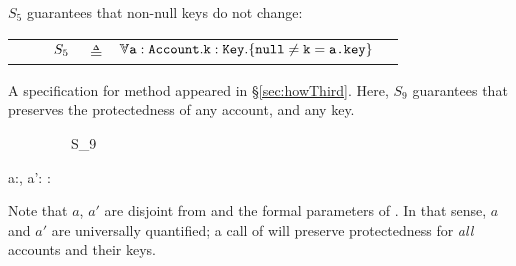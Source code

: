 {
 \begin{example}
 \label{example:twostate}
 $S_5$  guarantees   that   non-null keys do not change:
 \\
 \begin{tabular}{lcll}
$\strut \ \ \ \ \ \ \ \ S_5$ & $\triangleq$   & ${\TwoStatesN {\prg{a}:\prg{Account}.\prg{k}:\prg{Key}}  {\prg{null}\neq \prg{k}=\prg{a.\password}}} $  \end{tabular}
 \end{example} 
 }

 \begin{example}
 \label{example:mprepostl}
 A specification for method  appeared in \S\ref{sec:howThird}. 
Here,  $S_9$    guarantees that  preserves the protectedness of any account, and any key. %

   {\sprepost
		{\strut \ \ \ \ \ \ \ \ \ S_9} 
		{  a:, a':\wedge  {}\wedge  {} }
		{} {} {:}
		{   \wedge  {}  }
		{   \wedge  {} }
}

Note that %
$a$, $a'$ are disjoint from  and the formal parameters of . 
In that sense, $a$ and $a'$ are universally quantified; a call of  will preserve protectedness for \emph{ all} accounts and their keys. %

\end{example}
 



\label{ssect:sem}
 
